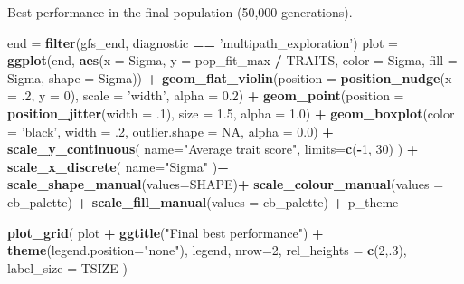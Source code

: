 \documentclass[]{book}
\newenvironment{Shaded}{\begin{snugshade}}{\end{snugshade}}
\newcommand{\DataTypeTok}[1]{\textcolor[rgb]{0.13,0.29,0.53}{#1}}
\newcommand{\DecValTok}[1]{\textcolor[rgb]{0.00,0.00,0.81}{#1}}
\newcommand{\FloatTok}[1]{\textcolor[rgb]{0.00,0.00,0.81}{#1}}
\newcommand{\KeywordTok}[1]{\textcolor[rgb]{0.13,0.29,0.53}{\textbf{#1}}}
\newcommand{\NormalTok}[1]{#1}
\newcommand{\OperatorTok}[1]{\textcolor[rgb]{0.81,0.36,0.00}{\textbf{#1}}}
\newcommand{\OtherTok}[1]{\textcolor[rgb]{0.56,0.35,0.01}{#1}}
\newcommand{\StringTok}[1]{\textcolor[rgb]{0.31,0.60,0.02}{#1}}
\begin{document}
Best performance in the final population (50,000 generations).

\begin{Shaded}
\begin{Highlighting}[]
\NormalTok{end =}\StringTok{ }\KeywordTok{filter}\NormalTok{(gfs_end, diagnostic }\OperatorTok{==}\StringTok{ 'multipath_exploration'}\NormalTok{)}
\NormalTok{plot =}\StringTok{ }\KeywordTok{ggplot}\NormalTok{(end, }\KeywordTok{aes}\NormalTok{(}\DataTypeTok{x =}\NormalTok{ Sigma, }\DataTypeTok{y =}\NormalTok{ pop_fit_max }\OperatorTok{/}\StringTok{ }\NormalTok{TRAITS, }\DataTypeTok{color =}\NormalTok{ Sigma, }\DataTypeTok{fill =}\NormalTok{ Sigma, }\DataTypeTok{shape =}\NormalTok{ Sigma)) }\OperatorTok{+}
\StringTok{  }\KeywordTok{geom_flat_violin}\NormalTok{(}\DataTypeTok{position =} \KeywordTok{position_nudge}\NormalTok{(}\DataTypeTok{x =} \FloatTok{.2}\NormalTok{, }\DataTypeTok{y =} \DecValTok{0}\NormalTok{), }\DataTypeTok{scale =} \StringTok{'width'}\NormalTok{, }\DataTypeTok{alpha =} \FloatTok{0.2}\NormalTok{) }\OperatorTok{+}
\StringTok{  }\KeywordTok{geom_point}\NormalTok{(}\DataTypeTok{position =} \KeywordTok{position_jitter}\NormalTok{(}\DataTypeTok{width =} \FloatTok{.1}\NormalTok{), }\DataTypeTok{size =} \FloatTok{1.5}\NormalTok{, }\DataTypeTok{alpha =} \FloatTok{1.0}\NormalTok{) }\OperatorTok{+}
\StringTok{  }\KeywordTok{geom_boxplot}\NormalTok{(}\DataTypeTok{color =} \StringTok{'black'}\NormalTok{, }\DataTypeTok{width =} \FloatTok{.2}\NormalTok{, }\DataTypeTok{outlier.shape =} \OtherTok{NA}\NormalTok{, }\DataTypeTok{alpha =} \FloatTok{0.0}\NormalTok{) }\OperatorTok{+}
\StringTok{  }\KeywordTok{scale_y_continuous}\NormalTok{(}
    \DataTypeTok{name=}\StringTok{"Average trait score"}\NormalTok{,}
    \DataTypeTok{limits=}\KeywordTok{c}\NormalTok{(}\OperatorTok{-}\DecValTok{1}\NormalTok{, }\DecValTok{30}\NormalTok{)}
\NormalTok{  ) }\OperatorTok{+}
\StringTok{  }\KeywordTok{scale_x_discrete}\NormalTok{(}
    \DataTypeTok{name=}\StringTok{"Sigma"}
\NormalTok{  )}\OperatorTok{+}
\StringTok{  }\KeywordTok{scale_shape_manual}\NormalTok{(}\DataTypeTok{values=}\NormalTok{SHAPE)}\OperatorTok{+}
\StringTok{  }\KeywordTok{scale_colour_manual}\NormalTok{(}\DataTypeTok{values =}\NormalTok{ cb_palette) }\OperatorTok{+}
\StringTok{  }\KeywordTok{scale_fill_manual}\NormalTok{(}\DataTypeTok{values =}\NormalTok{ cb_palette) }\OperatorTok{+}
\StringTok{  }\NormalTok{p_theme}

\KeywordTok{plot_grid}\NormalTok{(}
\NormalTok{  plot }\OperatorTok{+}
\StringTok{    }\KeywordTok{ggtitle}\NormalTok{(}\StringTok{"Final best performance"}\NormalTok{) }\OperatorTok{+}
\StringTok{    }\KeywordTok{theme}\NormalTok{(}\DataTypeTok{legend.position=}\StringTok{"none"}\NormalTok{),}
\NormalTok{  legend,}
  \DataTypeTok{nrow=}\DecValTok{2}\NormalTok{,}
  \DataTypeTok{rel_heights =} \KeywordTok{c}\NormalTok{(}\DecValTok{2}\NormalTok{,.}\DecValTok{3}\NormalTok{),}
  \DataTypeTok{label_size =}\NormalTok{ TSIZE}
\NormalTok{)}
\end{Highlighting}
\end{Shaded}
\end{document}

